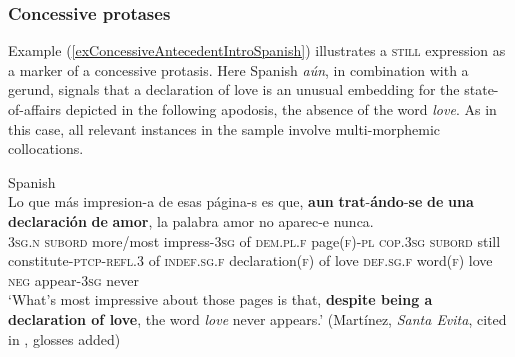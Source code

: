 \subsubsection{Concessive protases}
\label{sectionConcessiveAntecedent}
Example (\ref{exConcessiveAntecedentIntroSpanish}) illustrates a \textsc{still} expression as a marker of a concessive protasis. Here  Spanish \textit{aún}, in combination with a gerund, signals that a declaration of love is an unusual embedding for the state-of-affairs depicted in the following apodosis, the absence of the word \textit{love}. As in this case, all relevant instances in the sample involve multi-morphemic collocations.

\begin{exe}
	\ex Spanish\label{exConcessiveAntecedentIntroSpanish}\\
	\gll Lo que más impresion-a de esas página-s es que, \textbf{aun} \textbf{trat}-\textbf{ándo}-\textbf{se} \textbf{de} \textbf{una} \textbf{declaración} \textbf{de} \textbf{amor}, la palabra amor no aparec-e nunca.\\
		3\textsc{sg}.\textsc{n} \textsc{subord} more/most impress-3\textsc{sg} of \textsc{dem}.\textsc{pl}.\textsc{f} page(\textsc{f})-\textsc{pl} \textsc{cop}.3\textsc{sg} \textsc{subord} still constitute-\textsc{ptcp}-\textsc{refl}.3 of \textsc{indef}.\textsc{sg}.\textsc{f} declaration(\textsc{f}) of love \textsc{def}.\textsc{sg}.\textsc{f} word(\textsc{f}) love \textsc{neg} appear-3\textsc{sg} never\\
	\glt \lq What’s most impressive about those pages is that, \textbf{despite being a declaration of love}, the word \textit{love} never appears.' (Martínez, \textit{Santa Evita}, cited in \cite[§27.5i]{RAEGramatica}, glosses added)
\end{exe}

